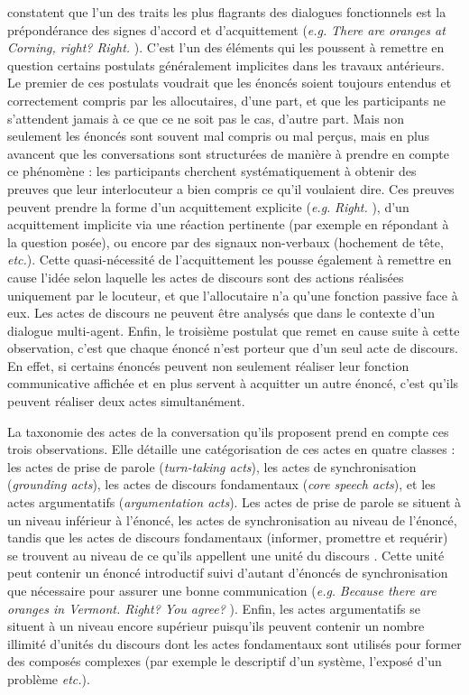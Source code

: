 \documentclass[10pt,a4paper,twoside]{article}
\begin{document}
\citeauthor{traum1992conversation} constatent que l'un des traits les plus flagrants des dialogues fonctionnels est la prépondérance des signes d'accord et d'acquittement (\textit{e.g.} \textit{\og There are oranges at Corning, right? \fg{} \og Right. \fg}). C'est l'un des éléments qui les poussent à remettre en question certains postulats généralement implicites dans les travaux antérieurs. Le premier de ces postulats voudrait que les énoncés soient toujours entendus et correctement compris par les allocutaires, d'une part, et que les participants ne s'attendent jamais à ce que ce ne soit pas le cas, d'autre part. Mais non seulement les énoncés sont souvent mal compris ou mal perçus, mais en plus \citeauthor{traum1992conversation} avancent que les conversations sont structurées de manière à prendre en compte ce phénomène : les participants cherchent systématiquement à obtenir des preuves que leur interlocuteur a bien compris ce qu'il voulaient dire. Ces preuves peuvent prendre la forme d'un acquittement explicite (\textit{e.g.} \textit{\og Right. \fg}), d'un acquittement implicite via une réaction pertinente (par exemple en répondant à la question posée), ou encore par des signaux non-verbaux (hochement de tête, \textit{etc.}). Cette quasi-nécessité de l'acquittement les pousse également à remettre en cause l'idée selon laquelle les actes de discours sont des actions réalisées uniquement par le locuteur, et que l'allocutaire n'a qu'une fonction passive face à eux. Les actes de discours ne peuvent être analysés que dans le contexte d'un dialogue multi-agent. Enfin, le troisième postulat que \citeauthor{traum1992conversation} remet en cause suite à cette observation, c'est que chaque énoncé n'est porteur que d'un seul acte de discours. En effet, si certains énoncés peuvent non seulement réaliser leur fonction communicative affichée et en plus servent à acquitter un autre énoncé, c'est qu'ils peuvent réaliser deux actes simultanément.

La taxonomie des actes de la conversation qu'ils proposent prend en compte ces trois observations. Elle détaille une catégorisation de ces actes en quatre classes : les actes de prise de parole (\textit{turn-taking acts}), les actes de synchronisation (\textit{grounding acts}), les actes de discours fondamentaux (\textit{core speech acts}), et les actes argumentatifs (\textit{argumentation acts}). Les actes de prise de parole se situent à un niveau inférieur à l'énoncé, les actes de synchronisation au niveau de l'énoncé, tandis que les actes de discours fondamentaux (informer, promettre et requérir) se trouvent au niveau de ce qu'ils appellent une \og unité du discours \fg. Cette unité peut contenir un énoncé introductif suivi d'autant d'énoncés de synchronisation que nécessaire pour assurer une bonne communication (\textit{e.g.} \textit{\og Because there are oranges in Vermont. Right? You agree? \fg}). Enfin, les actes argumentatifs se situent à un niveau encore supérieur puisqu'ils peuvent contenir un nombre illimité d'unités du discours dont les actes fondamentaux sont utilisés pour former des composés complexes (par exemple le descriptif d'un système, l'exposé d'un problème \textit{etc.}).
\end{document}
